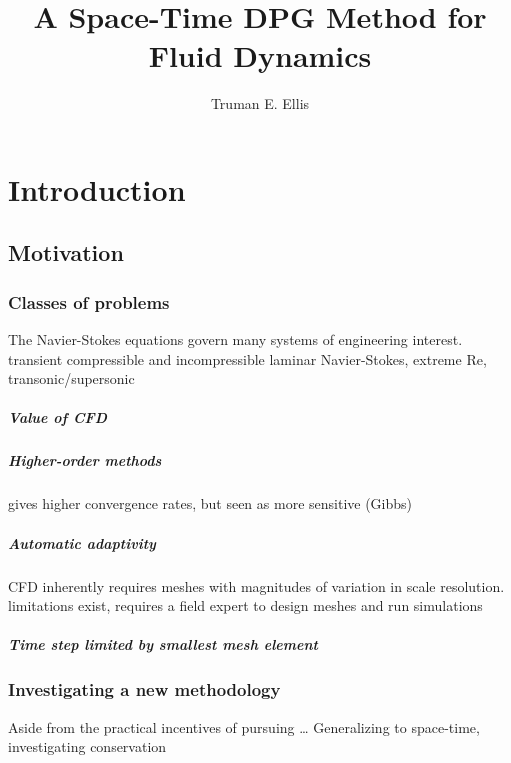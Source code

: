 \documentclass[12pt]{report}
\author{Truman E. Ellis}
\title{A Space-Time DPG Method for Fluid Dynamics}
\begin{document}
\titlepage

\tableofcontents   %



\chapter{Introduction}



\section{Motivation}


\subsection{Classes of problems}
The Navier-Stokes equations govern many systems of engineering interest.
transient compressible and incompressible laminar Navier-Stokes, extreme Re,
transonic/supersonic
\paragraph{Value of CFD}
\paragraph{Higher-order methods}
gives higher convergence rates, but seen as more sensitive (Gibbs)
\paragraph{Automatic adaptivity}
CFD inherently requires meshes with magnitudes of variation in scale
resolution.
limitations exist, requires a field expert to design meshes and run
simulations
\paragraph{Time step limited by smallest mesh element} \cite{Lew2003}

\subsection{Investigating a new methodology}
Aside from the practical incentives of pursuing \ldots
Generalizing to space-time, investigating conservation
\end{document}
